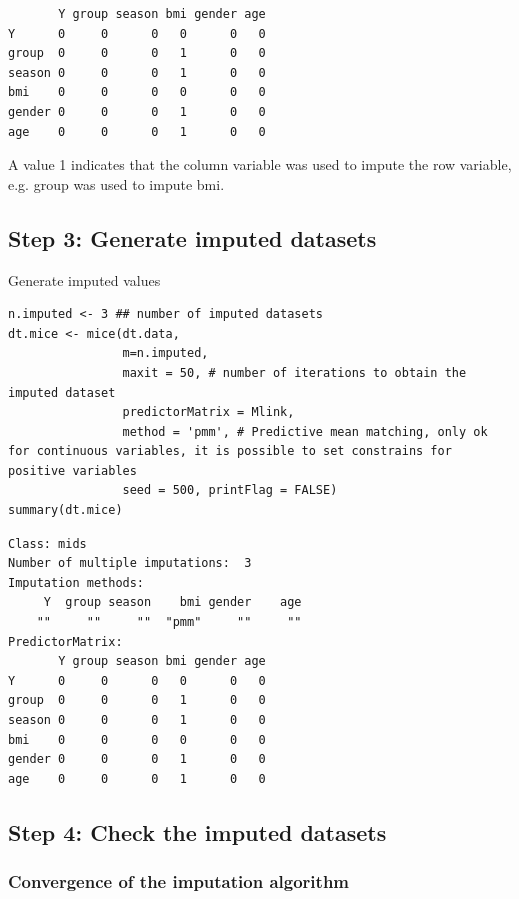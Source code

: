 \documentclass[12pt]{article}
\begin{document}
\begin{verbatim}
       Y group season bmi gender age
Y      0     0      0   0      0   0
group  0     0      0   1      0   0
season 0     0      0   1      0   0
bmi    0     0      0   0      0   0
gender 0     0      0   1      0   0
age    0     0      0   1      0   0
\end{verbatim}

A value 1 indicates that the column variable was used to impute the
row variable, e.g. group was used to impute bmi.

\clearpage

\subsection{Step 3: Generate imputed datasets}
\label{sec:orgef4a2e5}
Generate imputed values
\lstset{language=r,label= ,caption= ,captionpos=b,numbers=none}
\begin{lstlisting}
n.imputed <- 3 ## number of imputed datasets
dt.mice <- mice(dt.data,
				m=n.imputed, 
				maxit = 50, # number of iterations to obtain the imputed dataset
				predictorMatrix = Mlink,
				method = 'pmm', # Predictive mean matching, only ok for continuous variables, it is possible to set constrains for positive variables
				seed = 500, printFlag = FALSE)
summary(dt.mice)
\end{lstlisting}

\begin{verbatim}
Class: mids
Number of multiple imputations:  3 
Imputation methods:
     Y  group season    bmi gender    age 
    ""     ""     ""  "pmm"     ""     "" 
PredictorMatrix:
       Y group season bmi gender age
Y      0     0      0   0      0   0
group  0     0      0   1      0   0
season 0     0      0   1      0   0
bmi    0     0      0   0      0   0
gender 0     0      0   1      0   0
age    0     0      0   1      0   0
\end{verbatim}

\clearpage

\subsection{Step 4: Check the imputed datasets}
\label{sec:orga49f6c5}
\subsubsection{Convergence of the imputation algorithm}
\label{sec:orgf31e1b7}
\end{document}
